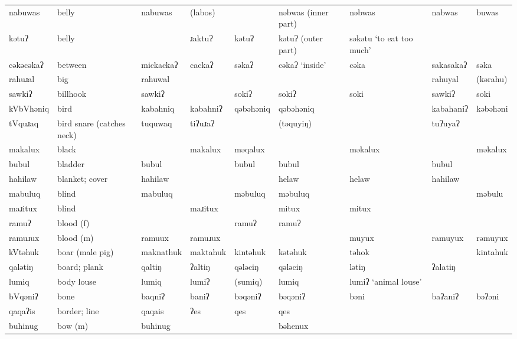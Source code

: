 \begin{landscape}
\begin{longtable}{*{9}{>{\raggedright\arraybackslash}p{}}}
\text{*}nabuwas      & belly & nabuwas & (labos) &  & nəbwas (inner part) & nəbwas & nabwas & buwas\\
\text{*}kətuʔ       & belly &  & ɹaktuʔ & kətuʔ & kətuʔ (outer part) & səkətu `to eat too much' &  & \\
\text{*}cəkəcəkaʔ    & between & mickackaʔ & cackaʔ & səkaʔ & cəkaʔ `inside' & cəka & sakasakaʔ & səka\\
\text{*}rahuɹal      & big & rahuwal &  &  &  &  & rahuyal & (kərahu)\\
\text{*}sawkiʔ       & billhook & sawkiʔ &  & sokiʔ & sokiʔ & soki & sawkiʔ & soki\\
\text{*}kVbVhəniq    & bird & kabahniq & kabahniʔ & qəbəhəniq & qəbəhəniq &  & kabahaniʔ & kəbəhəni\\
\text{*}tVquɹaq      & bird snare (catches neck) & tuquwaq & tiʔuɹaʔ &  & (təquyiŋ) &  & tuʔuyaʔ & \\
\text{*}makalux      & black &  & makalux & məqalux &  & məkalux &  & məkalux\\
\text{*}bubul        & bladder & bubul &  & bubul & bubul &  & bubul & \\
\text{*}hahilaw      & blanket; cover & hahilaw &  &  & helaw & helaw & hahilaw & \\
\text{*}mabuluq      & blind & mabuluq &  & məbuluq & məbuluq &  &  & məbulu\\
\text{*}maɹitux      & blind &  & maɹitux &  & mitux & mitux &  & \\
\text{*}ramuʔ        & blood (f) &  &  & ramuʔ & ramuʔ &  &  & \\
\text{*}ramuɹux      & blood (m) & ramuux & ramuɹux &  &  & muyux & ramuyux & rəmuyux\\
\text{*}kVtəhuk      & boar (male pig) & maknathuk & maktahuk & kintəhuk & kətəhuk & təhok &  & kintahuk\\
\text{*}qalətiŋ      & board; plank & qaltiŋ & ʔaltiŋ & qələciŋ & qələciŋ & lətiŋ & ʔalatiŋ & \\
\text{*}lumiq        & body louse & lumiq & lumiʔ & (sumiq) & lumiq & lumiʔ \newline `animal louse' &  & \\
\text{*}bVqəniʔ      & bone & baqniʔ & baniʔ & bəqəniʔ & bəqəniʔ & bəni & baʔaniʔ & bəʔəni\\
\text{*}qaqaʔis      & border; line & qaqais & ʔes & qes & qes &  &  & \\
\text{*}buhinug      & bow (m) & buhinug &  &  & bəhenux &  &  & \\

\end{longtable}
\end{landscape}
